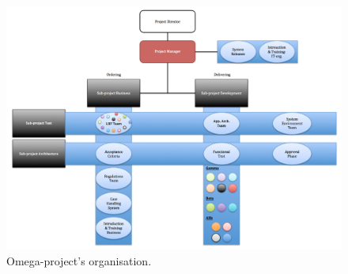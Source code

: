 \begin{figure}[H]
\centering
\includegraphics[trim = 0mm 0mm 0mm 0mm,width=150mm]{images/omega_organisation.png}
\caption{Omega-project's organisation.}
\label{omega}
\end{figure}

